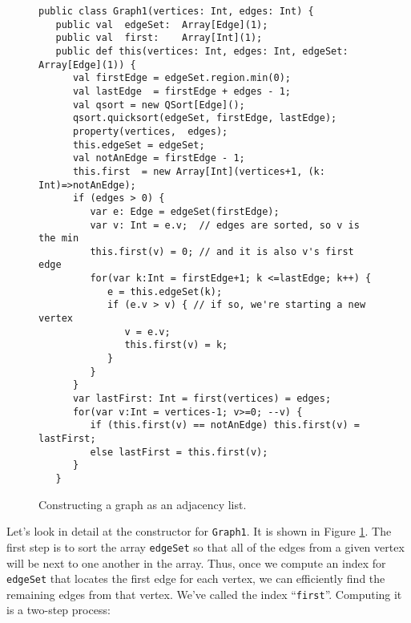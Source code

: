 \begin{figure}[!htbp]
\hrulefill
\begin{verbatim}
public class Graph1(vertices: Int, edges: Int) {
   public val  edgeSet:  Array[Edge](1); 
   public val  first:    Array[Int](1);
   public def this(vertices: Int, edges: Int, edgeSet: Array[Edge](1)) {
      val firstEdge = edgeSet.region.min(0);
      val lastEdge  = firstEdge + edges - 1;
      val qsort = new QSort[Edge]();
      qsort.quicksort(edgeSet, firstEdge, lastEdge);
      property(vertices,  edges);
      this.edgeSet = edgeSet;
      val notAnEdge = firstEdge - 1;
      this.first  = new Array[Int](vertices+1, (k: Int)=>notAnEdge);
      if (edges > 0) {
         var e: Edge = edgeSet(firstEdge);
         var v: Int = e.v;  // edges are sorted, so v is the min
         this.first(v) = 0; // and it is also v's first edge
         for(var k:Int = firstEdge+1; k <=lastEdge; k++) {
            e = this.edgeSet(k);
            if (e.v > v) { // if so, we're starting a new vertex
               v = e.v;
               this.first(v) = k;
            }
         }
      }
      var lastFirst: Int = first(vertices) = edges;
      for(var v:Int = vertices-1; v>=0; --v) {
         if (this.first(v) == notAnEdge) this.first(v) = lastFirst;
         else lastFirst = this.first(v);
      }
   }
\end{verbatim}
\caption{Constructing a graph as an adjacency list.}
\label{fig:g1con}
\hrulefill
\end{figure}
Let's look in detail at the constructor for {\tt Graph1}.  It is shown in 
Figure \ref{fig:g1con}.  The first step is to sort the
array {\tt edgeSet} so that all of the edges from a given vertex will
be next to one another in the array.  Thus, once we compute an index for {\tt edgeSet}
that locates the first edge for each vertex, we can efficiently find the remaining
edges from that vertex.
We've called the index ``{\tt first}''.  Computing it is a two-step process:
